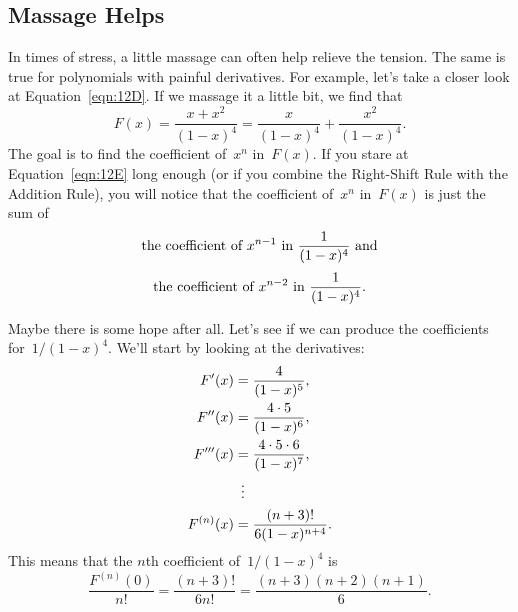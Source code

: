 \subsection{Massage Helps}

In times of stress, a little massage can often help relieve the
tension.  The same is true for polynomials with painful derivatives.
For example, let's take a closer look at Equation~\ref{eqn:12D}.  If
we massage it a little bit, we find that
\begin{equation}
F(x)    = \frac{x + x^2}{(1 - x)^4}
        = \frac{x}{(1 - x)^4} + \frac{x^2}{(1 - x)^4}. \label{eqn:12E}
\end{equation}
The goal is to find the coefficient of~$x^n$ in~$F(x)$.  If you stare
at Equation~\ref{eqn:12E} long enough (or if you combine the
Right-Shift Rule with the Addition Rule), you will notice that the
coefficient of~$x^n$ in~$F(x)$ is just the sum of
\begin{gather*}
    \text{the coefficient of~$x^{n - 1}$ in $\frac{1}{(1 - x)^4}$ and}
\\[\smallskipamount]
    \text{the coefficient of~$x^{n - 2}$ in $\frac{1}{(1 - x)^4}$}.
\end{gather*}

Maybe there is some hope after all.  Let's see if we can produce the
coefficients for~$1/(1 - x)^4$.  We'll start by looking at the
derivatives:
\begin{align*}
F'(x)       &= \frac{4}{(1 - x)^5}, \\
F''(x)      &= \frac{4 \cdot 5}{(1 - x)^6}, \\
F'''(x)     &= \frac{4 \cdot 5 \cdot 6}{(1 - x)^7}, \\
            &\enskip \vdots \\
F^{(n)}(x)  &= \frac{(n + 3)!}{ 6 (1 - x)^{n+4} }.
\end{align*}
This means that the $n$th coefficient of~$1/(1 - x)^4$ is
\begin{equation}
\frac{F^{(n)}(0)}{n!}
    = \frac{(n + 3)!}{6 n!} 
    = \frac{(n + 3) (n + 2) (n + 1)}{6}. \label{eqn:12F}
\end{equation}

